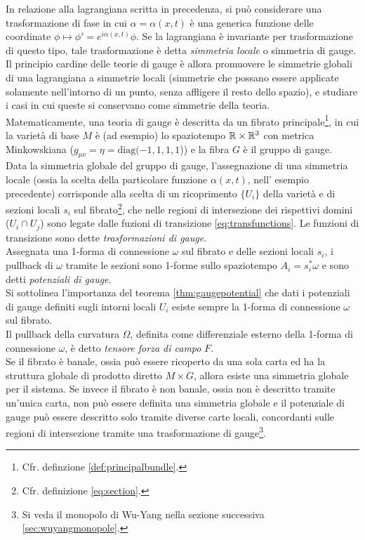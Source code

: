 In relazione alla lagrangiana scritta in precedenza, si può considerare una trasformazione
di fase in cui $\alpha = \alpha(x,t)$ è una generica funzione delle coordinate
$\phi \mapsto \phi' = e^{i\alpha(x,t)}\phi$. Se la lagrangiana è invariante per
trasformazione di questo tipo, tale trasformazione è detta \emph{simmetria locale}
o simmetria di gauge.\\

Il principio cardine delle teorie di gauge è allora promuovere le simmetrie globali
di una lagrangiana a simmetrie locali (simmetrie che possano essere applicate
solamente nell'intorno di un punto, senza affligere il resto dello spazio), e studiare
i casi in cui queste si conservano come simmetrie della teoria. \\

Matematicamente, una teoria di gauge è descritta da un fibrato principale\footnote{
   Cfr. definzione \ref{def:principalbundle}.
}, in cui
la varietà di base $M$ è (ad esempio) lo spaziotempo $\mathbb{R}\times\mathbb{R}^3$ con metrica
Minkowskiana ($g_{\mu\nu} =\eta= \mathrm{diag}(-1,1,1,1$)) e la fibra $G$ è il
gruppo di gauge.\\
Data la simmetria globale del gruppo di gauge, l'assegnazione di una simmetria
locale (ossia la scelta della particolare funzione $\alpha(x,t)$, nell' esempio
 precedente) corrisponde alla scelta di un ricoprimento $\{U_i\}$ della varietà
 e di sezioni locali $s_i$ sul fibrato\footnote{
   Cfr. definizione \ref{eq:section}.
 }, che nelle regioni di intersezione dei rispettivi domini ($U_i \cap U_j$)
 sono legate dalle fuzioni di transizione \ref{eq:transfunctions}.
Le funzioni di transizione sono dette \emph{trasformazioni di gauge}.\\

Assegnata una 1-forma di connessione $\omega$ sul fibrato e delle sezioni locali
$s_i$, i pullback di $\omega$ tramite le sezioni sono 1-forme sullo spaziotempo
$A_i = s_i^* \omega$ e sono detti \emph{potenziali di gauge}.\\
Si sottolinea l'importanza del teorema \ref{thm:gaugepotential} che dati i
potenziali di gauge definiti sugli intorni locali $U_i$ esiste sempre la 1-forma
di connessione $\omega$ sul fibrato.\\

Il pullback della curvatura $\Omega$, definita come differenziale esterno della
1-forma di connessione $\omega$, è detto \emph{tensore forza di campo} $F$.\\

Se il fibrato è banale, ossia può essere ricoperto da una sola carta ed ha la
struttura globale di prodotto diretto $M \times G$, allora esiste una simmetria
globale per il sistema. Se invece il fibrato è non banale, ossia non è descritto
tramite un'unica carta, non può essere definita una simmetria globale e il potenziale
di gauge può essere descritto solo tramite diverse carte locali, concordanti sulle
regioni di intersezione tramite una trasformazione di gauge\footnote{
  Si veda il monopolo di Wu-Yang nella sezione successiva \ref{sec:wuyangmonopole}.
}.\\

